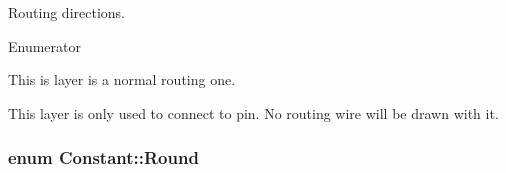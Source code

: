 Routing directions. \begin{Desc}
\item[Enumerator]\par
\begin{description}
\item[{\em 
\hypertarget{namespaceConstant_ab2e46a17cc373a268c5c24fa0e2067e5ac83c789478a5dfedee2496415c62c1fb}{Default}\label{namespaceConstant_ab2e46a17cc373a268c5c24fa0e2067e5ac83c789478a5dfedee2496415c62c1fb}
}]This is layer is a normal routing one. \item[{\em 
\hypertarget{namespaceConstant_ab2e46a17cc373a268c5c24fa0e2067e5a816e7f6e3fb44de0c2da893f32a6748e}{Pin\-Only}\label{namespaceConstant_ab2e46a17cc373a268c5c24fa0e2067e5a816e7f6e3fb44de0c2da893f32a6748e}
}]This layer is only used to connect to pin. No routing wire will be drawn with it. \end{description}
\end{Desc}
\hypertarget{namespaceConstant_abb6258ce09861f20cfe37b49d9a3515f}{
\subsubsection[{Round}]{\setlength{\rightskip}{0pt plus 5cm}enum {\bf Constant\-::\-Round}}}\label{namespaceConstant_abb6258ce09861f20cfe37b49d9a3515f}
